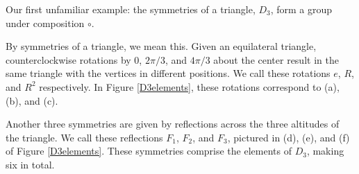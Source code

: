 \documentclass{amsart}
\begin{document}
\begin{example}\label{D3}
   Our first unfamiliar example: the symmetries of a triangle, \(D_3\), form a
	group under composition \(\circ\).

	By symmetries of a triangle, we mean this. Given an equilateral triangle,
	counterclockwise rotations by \(0\), \(2\pi/3\), and \(4\pi/3\) about the
	center result in the same triangle with the vertices in different positions.
	We call these rotations \(e\), \(R\), and \(R^2\) respectively. In Figure
	\ref{D3elements}, these rotations correspond to (a), (b), and (c). 

	Another three symmetries are given by reflections across the three altitudes
	of the triangle. We call these reflections \(F_1\), \(F_2\), and \(F_3\),
	pictured in (d), (e), and (f) of Figure \ref{D3elements}. These symmetries
	comprise the elements of \(D_3\), making six in total.


\end{example}
\end{document}
